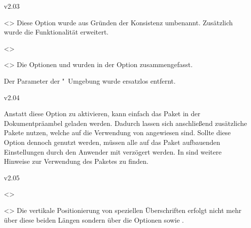 \begin{Entity}{}
\begin{NoIndexDefault}
\begin{Cessations}{v2.03}
\begin{Cessation}
  {}
  <>
\printdeclarationlist
%
Diese Option wurde aus Gründen der Konsistenz umbenannt. Zusätzlich wurde die 
Funktionalität erweitert.
\end{Cessation}

\begin{Cessation}
  {}
  <>
\begin{Cessation}
  {}
  <>
\printdeclarationlist
%
Die Optionen  und  wurden in der Option 
 zusammengefasst.
\end{Cessation}
\end{Cessation}

\begin{Declaration*}
  {}
\begin{Cessation}
  {}
\printdeclarationlist
%
Der Parameter  der 
"~Umgebung wurde ersatzlos entfernt.
\end{Cessation}
\end{Declaration*}
\end{Cessations}



\begin{Cessations}{v2.04}
\begin{Cessation}
  {}
\printdeclarationlist
%
Anstatt diese Option zu aktivieren, kann einfach das Paket  
in der Dokumentpräambel geladen werden. Dadurch lassen sich anschließend 
zusätzliche Pakete nutzen, welche auf die Verwendung von  
angewiesen sind. Sollte diese Option dennoch genutzt werden, müssen alle auf 
das Paket  aufbauenden Einstellungen durch den Anwender mit 
 verzögert werden. In 
 sind weitere Hinweise zur Verwendung des Paketes 
 zu finden.
\end{Cessation}
\end{Cessations}



\begin{Cessations}{v2.05}
\begin{Cessation}
  {}
  <>
\begin{Cessation}
  {}
  <>
\printdeclarationlist
%
Die vertikale Positionierung von speziellen Überschriften erfolgt nicht mehr 
über diese beiden Längen sondern über die Optionen  
sowie .
\end{Cessation}
\end{Cessation}



\end{Cessations}
\end{NoIndexDefault}
\end{Entity}
